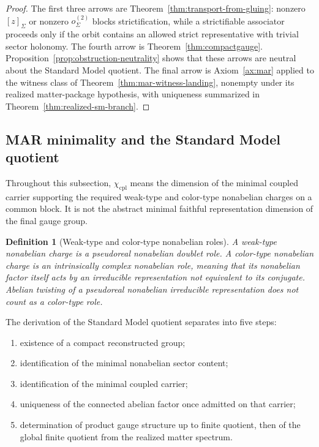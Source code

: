 \documentclass[11pt]{article}
\newtheorem{definition}[theorem]{Definition}
\begin{document}
\begin{proof}
The first three arrows are Theorem~\ref{thm:transport-from-gluing}: nonzero \([z]_\Sigma\) or
nonzero \(o^{(2)}_\Sigma\) blocks strictification, while a strictifiable associator proceeds only if the
orbit contains an allowed strict representative with trivial sector holonomy. The fourth arrow is Theorem~\ref{thm:compactgauge}.
Proposition~\ref{prop:obstruction-neutrality} shows that these arrows are neutral about the Standard
Model quotient. The final arrow is Axiom~\ref{ax:mar}
applied to the witness class of Theorem~\ref{thm:mar-witness-landing}, nonempty under its realized
matter-package hypothesis, with uniqueness
summarized in Theorem~\ref{thm:realized-sm-branch}.
\end{proof}

\subsection{MAR minimality and the Standard Model quotient}

Throughout this subsection, $\chi_{\mathrm{cpl}}$ means the dimension of the minimal coupled carrier supporting the required weak-type and color-type nonabelian charges on a common block. It is not the abstract minimal faithful representation dimension of the final gauge group.

\begin{definition}[Weak-type and color-type nonabelian roles]
A weak-type nonabelian charge is a pseudoreal nonabelian doublet role. A color-type nonabelian charge is an intrinsically complex nonabelian role, meaning that its nonabelian factor itself acts by an irreducible representation not equivalent to its conjugate. Abelian twisting of a pseudoreal nonabelian irreducible representation does not count as a color-type role.
\end{definition}

The derivation of the Standard Model quotient separates into five steps:
\begin{enumerate}[leftmargin=2em]
\item existence of a compact reconstructed group;
\item identification of the minimal nonabelian sector content;
\item identification of the minimal coupled carrier;
\item uniqueness of the connected abelian factor once admitted on that carrier;
\item determination of product gauge structure up to finite quotient, then of the global finite quotient from the realized matter spectrum.
\end{enumerate}
\end{document}
